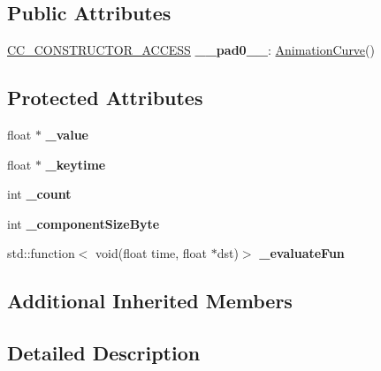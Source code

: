 \subsection*{Public Attributes}
\begin{DoxyCompactItemize}
\item 
\mbox{\label{classAnimationCurve_ae310d849d61f373eb47bc6652cf87dc6}} 
\hyperlink{_2cocos2d_2cocos_2base_2ccConfig_8h_a25ef1314f97c35a2ed3d029b0ead6da0}{C\+C\+\_\+\+C\+O\+N\+S\+T\+R\+U\+C\+T\+O\+R\+\_\+\+A\+C\+C\+E\+SS} {\bfseries \+\_\+\+\_\+pad0\+\_\+\+\_\+}\+: \hyperlink{classAnimationCurve}{Animation\+Curve}()
\end{DoxyCompactItemize}
\subsection*{Protected Attributes}
\begin{DoxyCompactItemize}
\item 
\mbox{\label{classAnimationCurve_a17be8cfaec915abcd68fdeb8d98b0085}} 
float $\ast$ {\bfseries \+\_\+value}
\item 
\mbox{\label{classAnimationCurve_ab59fd3c21b3b2e0f3468279b26a9ae0f}} 
float $\ast$ {\bfseries \+\_\+keytime}
\item 
\mbox{\label{classAnimationCurve_ad8be3e82d09abe76cbe5786b87f4270d}} 
int {\bfseries \+\_\+count}
\item 
\mbox{\label{classAnimationCurve_a447ffb809b559d5e6ed0cead74bf3520}} 
int {\bfseries \+\_\+component\+Size\+Byte}
\item 
\mbox{\label{classAnimationCurve_a29236cc1239137de4e0f92de1b52611a}} 
std\+::function$<$ void(float time, float $\ast$dst)$>$ {\bfseries \+\_\+evaluate\+Fun}
\end{DoxyCompactItemize}
\subsection*{Additional Inherited Members}


\subsection{Detailed Description}
